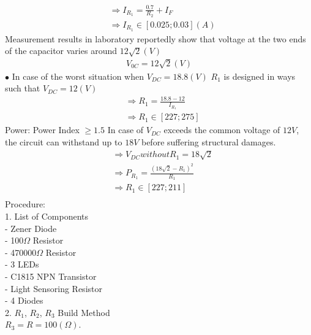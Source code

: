 \documentclass[12pt]{extarticle}
\newcommand{\<}{\langle}
\renewcommand{\>}{\rangle}
\theoremstyle{definition}
\begin{document}
\begin{normalsize}
\begin{align*}
&\Longrightarrow I_{R_1} = \frac{0.7}{R_2} + I_F\\
&\Longrightarrow I_{R_1} \in [0.025 ; 0.03] (A)
\end{align*}
Measurement results in laboratory reportedly show that voltage at the two ends of the capacitor varies around $12\sqrt{2} (V)$ 
\begin{align*}
V_{0C} = 12\sqrt{2} (V)
\end{align*}
$\bullet$ In case of the worst situation when $V_{DC} = 18.8(V)$
$R_1$ is designed in ways such that $V_{DC} = 12 (V)$
\begin{align*}
&\Longrightarrow R_1 = \frac{18.8 - 12}{I_{R_1}}\\
&\Longrightarrow R_1 \in [227 ; 275]
\end{align*}
Power: Power Index $\geq 1.5$
In case of $V_{DC}$ exceeds the common voltage of $12V$, the circuit can withstand up to $18V$ before suffering structural damages.
\begin{align*}
&\Longrightarrow V_{DC} without R_1 = 18\sqrt{2}\\
&\Longrightarrow P_{R_1} = \frac{(18\sqrt{2} - R_1)^2}{R_1}\\
&\Longrightarrow R_1 \in [227 ; 211]\\
\end{align*}
Procedure:\\
1. List of Components\\
- Zener Diode\\
- 100$\Omega$ Resistor\\
- 470000$\Omega$ Resistor\\
- 3 LEDs\\
- C1815 NPN Transistor\\
- Light Sensoring Resistor\\
- 4 Diodes\\
2. $R_1$, $R_2$, $R_3$ Build Method\\
$R_3 = R = 100(\Omega)$.\\
\end{normalsize}
\end{document}
